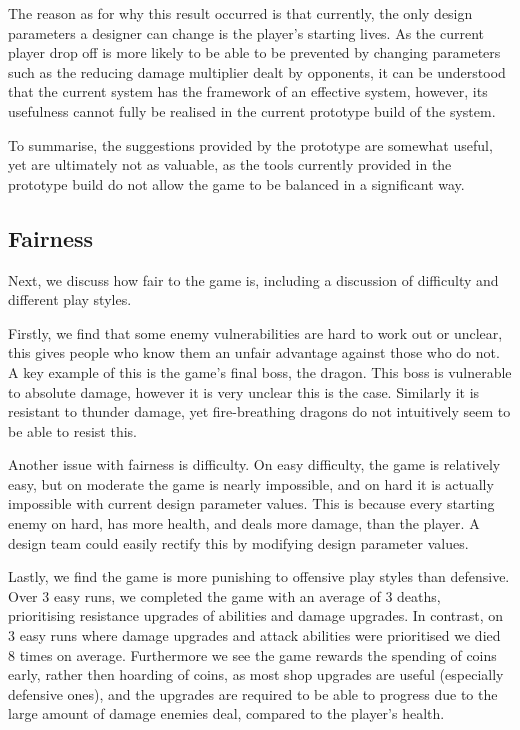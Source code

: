 The reason as for why this result occurred is that currently, the only
design parameters a designer can change is the player's starting lives.
As the current player drop off is more likely to be able to be prevented
by changing parameters such as the reducing damage multiplier dealt by
opponents, it can be understood that the current system has the
framework of an effective system, however, its usefulness cannot fully
be realised in the current prototype build of the system.

To summarise, the suggestions provided by the prototype are somewhat
useful, yet are ultimately not as valuable, as the tools currently
provided in the prototype build do not allow the game to be balanced in
a significant way.

\subsection{Fairness}


Next, we discuss how fair to the game is, including a discussion of difficulty and different play styles. 

Firstly, we find that some enemy vulnerabilities are hard to work out or unclear, this gives people who know them an unfair advantage against those who do not. A key example of this is the game's final boss, the dragon. This boss is vulnerable to absolute damage, however it is very unclear this is the case. Similarly it is resistant to thunder damage, yet fire-breathing dragons do not intuitively seem to be able to resist this. 

Another issue with fairness is difficulty. On easy difficulty, the game is relatively easy, but on moderate the game is nearly impossible, and on hard it is actually impossible with current design parameter values. This is because every starting enemy on hard, has more health, and deals more damage, than the player. A design team could easily rectify this by modifying design parameter values. 

Lastly, we find the game is more punishing to offensive play styles than defensive. Over 3 easy runs, we completed the game with an average of 3 deaths, prioritising resistance upgrades of abilities and damage upgrades. In contrast, on 3 easy runs where damage upgrades and attack abilities were prioritised we died 8 times on average. Furthermore we see the game rewards the spending of coins early, rather then hoarding of coins, as most shop upgrades are useful (especially defensive ones), and the upgrades are required to be able to progress due to the large amount of damage enemies deal, compared to the player's health. 

